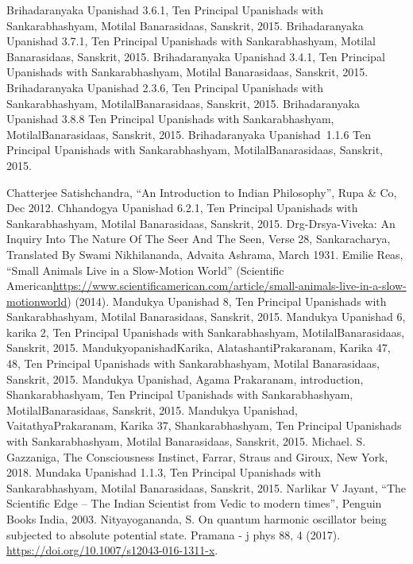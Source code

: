 \documentclass[twoside, 13pt]{article}
\begin{document}
{{{\begin{thebibliography}{99}
\bibitem{} Brihadaranyaka Upanishad 3.6.1, Ten Principal Upanishads with Sankarabhashyam, Motilal Banarasidaas, Sanskrit, 2015.
\bibitem{} Brihadaranyaka Upanishad 3.7.1, Ten Principal Upanishads with Sankarabhashyam, Motilal Banarasidaas, Sanskrit, 2015.
\bibitem{} Brihadaranyaka Upanishad 3.4.1, Ten Principal Upanishads with Sankarabhashyam, Motilal Banarasidaas, Sanskrit, 2015.
\bibitem{} Brihadaranyaka Upanishad 2.3.6, Ten Principal Upanishads with Sankarabhashyam, MotilalBanarasidaas, Sanskrit, 2015.
\bibitem{} Brihadaranyaka Upanishad 3.8.8 Ten Principal Upanishads with Sankarabhashyam, MotilalBanarasidaas, Sanskrit, 2015.
\bibitem{} Brihadaranyaka Upanishad~1.1.6 Ten Principal Upanishads with Sankarabhashyam, MotilalBanarasidaas, Sanskrit, 2015.

\newpage

\bibitem{} Chatterjee Satishchandra, “An Introduction to Indian Philosophy”, Rupa \& Co, Dec 2012.
\bibitem{} Chhandogya Upanishad 6.2.1, Ten Principal Upanishads with Sankarabhashyam, Motilal Banarasidaas, Sanskrit, 2015.
\bibitem{} Drg-Drsya-Viveka: An Inquiry Into The Nature Of The Seer And The Seen, Verse 28, Sankaracharya, Translated By Swami Nikhilananda, Advaita Ashrama, March 1931.
\bibitem{} Emilie Reas, “Small Animals Live in a Slow-Motion World” (Scientiﬁc American\break \url{https://www.scientiﬁcamerican.com/article/small-animals-live-in-a-slow-motionworld}) (2014). 
\bibitem{} Mandukya Upanishad 8, Ten Principal Upanishads with Sankarabhashyam, Motilal Banarasidaas, Sanskrit, 2015.
\bibitem{} Mandukya Upanishad 6, karika 2, Ten Principal Upanishads with Sankarabhashyam, MotilalBanarasidaas, Sanskrit, 2015.
\bibitem{} MandukyopanishadKarika, AlatashantiPrakaranam, Karika 47, 48, Ten Principal Upanishads with Sankarabhashyam, Motilal Banarasidaas, Sanskrit, 2015.
\bibitem{} Mandukya Upanishad, Agama Prakaranam, introduction, Shankarabhashyam, Ten Principal Upanishads with Sankarabhashyam, MotilalBanarasidaas, Sanskrit, 2015.
\bibitem{} Mandukya Upanishad, VaitathyaPrakaranam, Karika 37, Shankarabhashyam, Ten Principal Upanishads with Sankarabhashyam, Motilal Banarasidaas, Sanskrit, 2015.
\bibitem{} Michael. S. Gazzaniga, The Consciousness Instinct, Farrar, Straus and Giroux, New York, 2018.
\bibitem{} Mundaka Upanishad 1.1.3, Ten Principal Upanishads with Sankarabhashyam, Motilal Banarasidaas, Sanskrit, 2015.
\bibitem{} Narlikar V Jayant, “The Scientific Edge – The Indian Scientist from Vedic to modern times”, Penguin Books India, 2003.
\bibitem{} Nityayogananda, S. On quantum harmonic oscillator being subjected to absolute potential state. Pramana - j phys 88, 4 (2017). \url{https://doi.org/10.1007/s12043-016-1311-x}. 

\end{thebibliography}}}}
\end{document}

